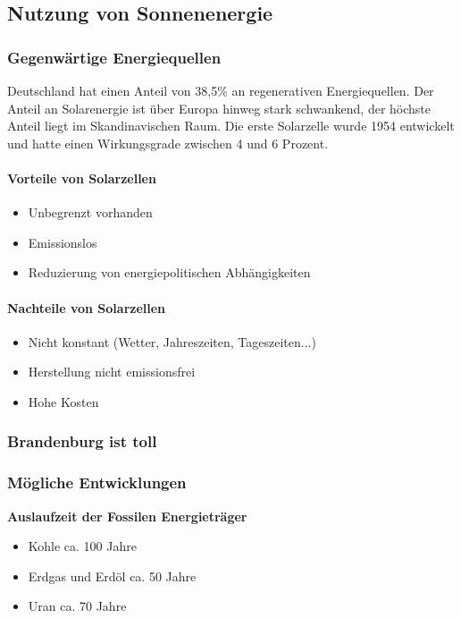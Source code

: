 \subsection{Nutzung von Sonnenenergie}

	\subsubsection{Gegenwärtige Energiequellen}
		Deutschland hat einen Anteil von 38,5\% an regenerativen Energiequellen. Der Anteil an Solarenergie ist über Europa hinweg stark schwankend, der höchste Anteil liegt im Skandinavischen Raum. Die erste Solarzelle wurde 1954 entwickelt und hatte einen Wirkungsgrade zwischen 4 und 6 Prozent.
		\paragraph{Vorteile von Solarzellen}
		\begin{itemize}
			\item Unbegrenzt vorhanden
			\item Emissionslos
			\item Reduzierung von energiepolitischen Abhängigkeiten
		\end{itemize}
		\paragraph{Nachteile von Solarzellen}
		\begin{itemize}
			\item Nicht konstant (Wetter, Jahreszeiten, Tageszeiten...)	
			\item Herstellung nicht emissionsfrei
			\item Hohe Kosten	
		\end{itemize}
	\subsubsection{Brandenburg ist toll}
	\subsubsection{Mögliche Entwicklungen}
		{\bfseries Auslaufzeit der Fossilen Energieträger}
		\begin{itemize}
			\item Kohle ca. 100 Jahre
			\item Erdgas und Erdöl ca. 50 Jahre
			\item Uran ca. 70 Jahre
		\end{itemize}

